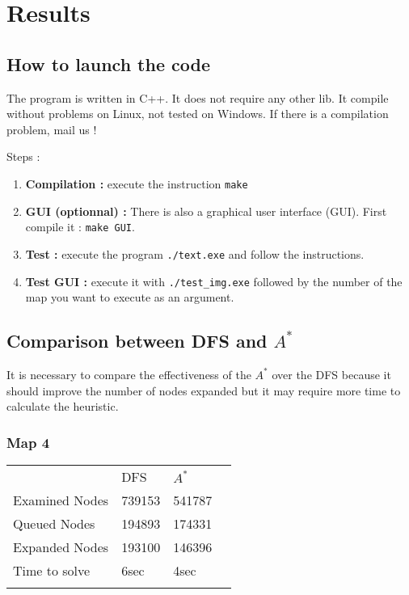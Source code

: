 \documentclass[journal]{IEEEtran}
\begin{document}
\section{Results}
\subsection{How to launch the code}
The program is written in C++.
It does not require any other lib.
It compile without problems on Linux, not tested on Windows.
If there is a compilation problem, mail us !

Steps :
\begin{enumerate}
    \item \textbf{Compilation :} execute the instruction \verb|make|

    \item \textbf{GUI (optionnal) :} There is also a graphical user interface (GUI).
    First compile it : \verb|make GUI|.

    \item \textbf{Test :} execute the program \verb|./text.exe|  and follow the instructions.

    \item \textbf{Test GUI :} execute it with \verb|./test_img.exe| followed by the number of the map you want to execute as an argument.
\end{enumerate}

\subsection{Comparison between DFS and $A^*$}
It is necessary to compare the effectiveness of the $A^*$ over the DFS because it should improve the number of nodes expanded but it may require more time to calculate the heuristic.

\subsubsection{Map 4}
\begin{tabular}{llll}
    & DFS & $A^*$ \\
   Examined Nodes & 739153 & 541787 \\
   Queued Nodes & 194893 & 174331 \\
   Expanded Nodes & 193100 & 146396 \\
   Time to solve & 6sec & 4sec \\\\
\end{tabular}
\end{document}
